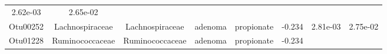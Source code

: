 \documentclass[11pt,]{article}
\begin{document}
\begin{longtable}[]{@{}cccccccc@{}}
\begin{minipage}[t]{0.08\columnwidth}
2.62e-03\strut
\end{minipage} & \begin{minipage}[t]{0.08\columnwidth}\centering\strut
2.65e-02\strut
\end{minipage}\tabularnewline
\begin{minipage}[t]{0.08\columnwidth}\centering\strut
Otu00252\strut
\end{minipage} & \begin{minipage}[t]{0.15\columnwidth}\centering\strut
Lachnospiraceae\strut
\end{minipage} & \begin{minipage}[t]{0.15\columnwidth}\centering\strut
Lachnospiraceae\strut
\end{minipage} & \begin{minipage}[t]{0.08\columnwidth}\centering\strut
adenoma\strut
\end{minipage} & \begin{minipage}[t]{0.09\columnwidth}\centering\strut
propionate\strut
\end{minipage} & \begin{minipage}[t]{0.07\columnwidth}\centering\strut
-0.234\strut
\end{minipage} & \begin{minipage}[t]{0.08\columnwidth}\centering\strut
2.81e-03\strut
\end{minipage} & \begin{minipage}[t]{0.08\columnwidth}\centering\strut
2.75e-02\strut
\end{minipage}\tabularnewline
\begin{minipage}[t]{0.08\columnwidth}\centering\strut
Otu01228\strut
\end{minipage} & \begin{minipage}[t]{0.15\columnwidth}\centering\strut
Ruminococcaceae\strut
\end{minipage} & \begin{minipage}[t]{0.15\columnwidth}\centering\strut
Ruminococcaceae\strut
\end{minipage} & \begin{minipage}[t]{0.08\columnwidth}\centering\strut
adenoma\strut
\end{minipage} & \begin{minipage}[t]{0.09\columnwidth}\centering\strut
propionate\strut
\end{minipage} & \begin{minipage}[t]{0.07\columnwidth}\centering\strut
-0.234\strut
\end{minipage} & \begin{minipage}[t]{0.08\columnwidth}\centering\strut

\end{minipage}
\end{longtable}
\end{document}
